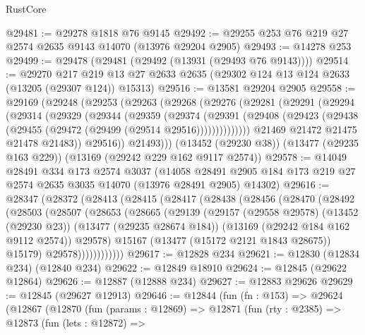 \begin{lexlean}{RustCore}
\begin{coremodule}
@29481 := @29278 @1818 @76 @9145
@29492 := @29255 @253 @76 @219 @27 @2574 @2635 @9143 @14070 (@13976 @29204 @2905)
@29493 := @14278 @253
@29499 := @29478 (@29481 (@29492 (@13931 (@29493 @76 @9143))))
@29514 := @29270
    @217
    @219
    @13
    @27
    @2633
    @2635
    (@29302 @124 @13 @124 @2633 (@13205 (@29307 @124)) @15313)
@29516 := @13581 @29204 @2905
@29558 := @29169
    (@29248
      (@29253
        (@29263
          (@29268
            (@29276
              (@29281
                (@29291
                  (@29294
                    (@29314
                      (@29329
                        (@29344
                          (@29359
                            (@29374
                              (@29391
                                (@29408
                                  (@29423
                                    (@29438 (@29455 (@29472 (@29499 (@29514 @29516))))))))))))))
                  @21469
                  @21472
                  @21475
                  @21478
                  @21483))
              @29516))
          @21493)))
    (@13452 (@29230 @38))
    (@13477 (@29235 @163 @229))
    (@13169 (@29242 @229 @162 @9117 @2574))
@29578 := @14049
    @28491
    @334
    @173
    @2574
    @3037
    (@14058 @28491 @2905 @184 @173 @219 @27 @2574 @2635 @3035 @14070 (@13976 @28491 @2905) @14302)
@29616 := @28347
    (@28372
      (@28413
        (@28415
          (@28417
            (@28438
              (@28456
                (@28470
                  (@28492
                    (@28503
                      (@28507
                        (@28653
                          (@28665
                            (@29139
                              (@29157
                                (@29558 @29578)
                                (@13452 (@29230 @23))
                                (@13477 (@29235 @28674 @184))
                                (@13169 (@29242 @184 @162 @9112 @2574))
                                @29578)
                              @15167
                              (@13477 (@15172 @2121 @1843 @28675))
                              @15179)
                            @29578))))))))))))
@29617 := @12828 @234
@29621 := @12830 (@12834 @234) (@12840 @234)
@29622 := @12849 @18910
@29624 := @12845 (@29622 @12864)
@29626 := @12887 (@12888 @234)
@29627 := @12883 @29626
@29629 := @12845 (@29627 @12913)
@29646 := @12844
    (fun (fn : @153) =>
    @29624
      (@12867
        (@12870
          (fun (params : @12869) =>
          @12871
            (fun (rty : @2385) =>
            @12873
              (fun (lets : @12872) =>

\end{coremodule}
\end{lexlean}
